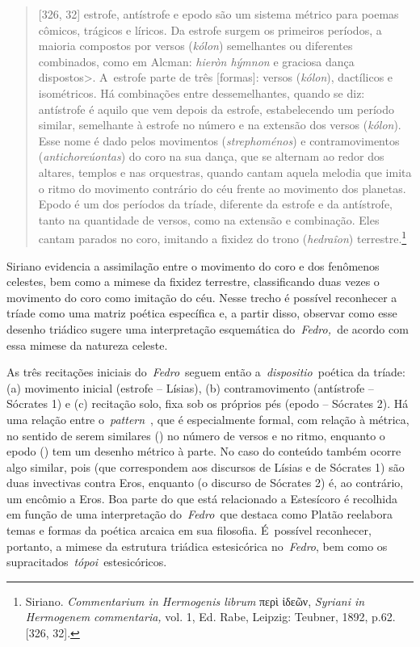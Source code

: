 \begin{quote}
[326, 32] estrofe, antístrofe e epodo são um sistema métrico para
poemas cômicos, trágicos e líricos. Da estrofe surgem os primeiros
períodos, a maioria compostos por versos (\emph{kólon}) semelhantes ou
diferentes combinados, como em Alcman: \emph{hieròn hýmnon} e graciosa dança
dispostos\textgreater{}. A~estrofe parte de três [formas]: versos
(\emph{kólon}), dactílicos e isométricos. Há combinações entre
dessemelhantes, quando se diz: antístrofe é aquilo que vem depois da
estrofe, estabelecendo um período similar, semelhante à estrofe no
número e na extensão dos versos (\emph{kólon}). Esse nome é dado pelos
movimentos (\emph{strephoménos}) e contramovimentos
(\emph{antichoreúontas}) do coro na sua dança, que se alternam ao redor
dos altares, templos e nas orquestras, quando cantam aquela melodia que
imita o ritmo do movimento contrário do céu frente ao movimento dos
planetas. Epodo é um dos períodos da tríade, diferente da estrofe e da
antístrofe, tanto na quantidade de versos, como na extensão e
combinação. Eles cantam parados no coro, imitando a fixidez do trono
(\emph{hedraîon}) terrestre.\footnote{Siriano.
  \emph{Commentarium in Hermogenis librum} περὶ ἰδεῶν, \emph{Syriani in
  Hermogenem commentaria,} vol. 1, Ed. Rabe,  Leipzig: Teubner, 1892,
  p.62. {[}326, 32{]}.}
\end{quote}

 

Siriano evidencia a assimilação entre o movimento do coro e dos
fenômenos celestes, bem como a mimese da fixidez terrestre,
classificando duas vezes o movimento do coro como imitação do céu. Nesse
trecho é possível reconhecer a tríade como uma matriz poética específica
e, a partir disso, observar como esse desenho triádico sugere uma
interpretação esquemática do~\emph{Fedro,~}de acordo com essa mimese da
natureza celeste.

As três recitações iniciais do~\emph{Fedro}~seguem então
a~\emph{dispositio}~poética da tríade: (a) movimento inicial (estrofe --
Lísias), (b) contramovimento (antístrofe -- Sócrates 1) e (c) recitação
solo, fixa sob os próprios pés (epodo -- Sócrates 2). Há uma relação
entre o~\emph{pattern}~, que é especialmente formal, com relação à
métrica, no sentido de serem similares () no número de versos e no
ritmo, enquanto o epodo () tem um desenho métrico à parte. No caso do
conteúdo também ocorre algo similar, pois  (que correspondem aos
discursos de Lísias e de Sócrates 1) são duas invectivas contra Eros,
enquanto  (o discurso de Sócrates 2) é, ao contrário, um encômio a
Eros. Boa parte do que está relacionado a Estesícoro é recolhida em
função de uma interpretação do~\emph{Fedro~}que destaca como Platão
reelabora temas e formas da poética arcaica em sua filosofia. É~possível
reconhecer, portanto, a mimese da estrutura triádica estesicórica
no~\emph{Fedro}, bem como os supracitados~\emph{tópoi}~estesicóricos.

